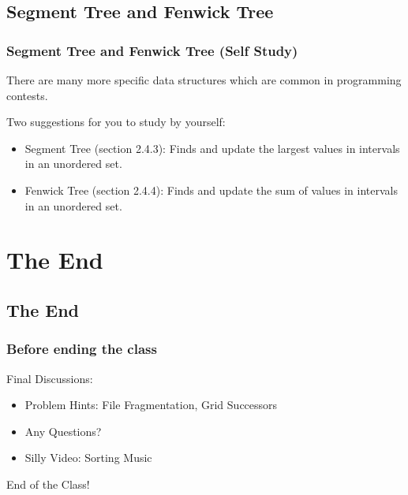 \documentclass{beamer}
\begin{document}
\subsection{Segment Tree and Fenwick Tree}
\begin{frame}
  \frametitle{Segment Tree and Fenwick Tree (Self Study)}

  There are many more specific data structures
  which are common in programming contests.

  \bigskip

  Two suggestions for you to study by yourself:

  \bigskip
  
  \begin{itemize}
  \item Segment Tree (section 2.4.3): Finds and update the
    largest values in intervals in an unordered set.

  \item Fenwick Tree (section 2.4.4): Finds and update the
    sum of values in intervals in an unordered set.
  \end{itemize}
  
\end{frame}

\section{The End}
\subsection{The End}
\begin{frame}
  \frametitle{Before ending the class}

  Final Discussions:
  \begin{itemize}
  \item Problem Hints: File Fragmentation, Grid Successors
  \item Any Questions?
  \item Silly Video: Sorting Music
  \end{itemize}  
  
\end{frame}

\begin{frame}
  End of the Class!
\end{frame}
\end{document}
